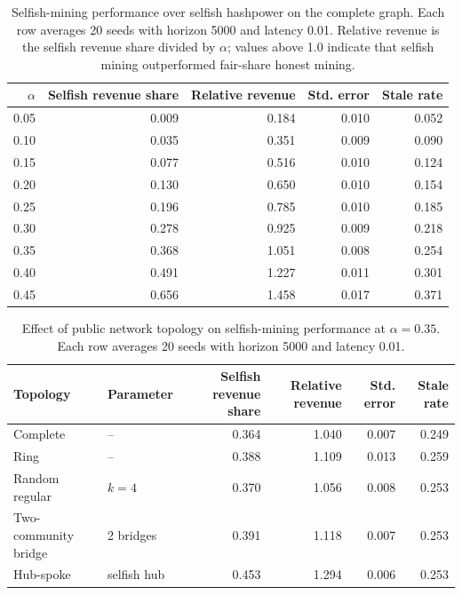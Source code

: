 
\begin{table}[htbp]
\centering
\caption{Selfish-mining performance over selfish hashpower on the complete graph. Each row averages 20 seeds with horizon 5000 and latency 0.01. Relative revenue is the selfish revenue share divided by $\alpha$; values above 1.0 indicate that selfish mining outperformed fair-share honest mining.}
\label{tab:v1-alpha-sweep}
\begin{tabular}{rrrrr}
\toprule
$\alpha$ & Selfish revenue share & Relative revenue & Std. error & Stale rate \\
\midrule
0.05 & 0.009 & 0.184 & 0.010 & 0.052 \\
0.10 & 0.035 & 0.351 & 0.009 & 0.090 \\
0.15 & 0.077 & 0.516 & 0.010 & 0.124 \\
0.20 & 0.130 & 0.650 & 0.010 & 0.154 \\
0.25 & 0.196 & 0.785 & 0.010 & 0.185 \\
0.30 & 0.278 & 0.925 & 0.009 & 0.218 \\
0.35 & 0.368 & 1.051 & 0.008 & 0.254 \\
0.40 & 0.491 & 1.227 & 0.011 & 0.301 \\
0.45 & 0.656 & 1.458 & 0.017 & 0.371 \\
\bottomrule
\end{tabular}
\end{table}

\begin{table}[htbp]
\centering
\caption{Effect of public network topology on selfish-mining performance at $\alpha = 0.35$. Each row averages 20 seeds with horizon 5000 and latency 0.01.}
\label{tab:v2-topology-sweep}
\begin{tabular}{llrrrr}
\toprule
Topology & Parameter & Selfish revenue share & Relative revenue & Std. error & Stale rate \\
\midrule
Complete & -- & 0.364 & 1.040 & 0.007 & 0.249 \\
Ring & -- & 0.388 & 1.109 & 0.013 & 0.259 \\
Random regular & $k = 4$ & 0.370 & 1.056 & 0.008 & 0.253 \\
Two-community bridge & 2 bridges & 0.391 & 1.118 & 0.007 & 0.253 \\
Hub-spoke & selfish hub & 0.453 & 1.294 & 0.006 & 0.253 \\
\bottomrule
\end{tabular}
\end{table}

